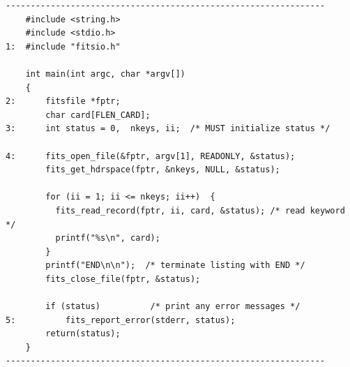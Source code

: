 \documentclass[11pt]{article}
\begin{document}
\begin{verbatim}
----------------------------------------------------------------
    #include <string.h>
    #include <stdio.h>
1:  #include "fitsio.h"

    int main(int argc, char *argv[])
    {
2:      fitsfile *fptr;
        char card[FLEN_CARD];
3:      int status = 0,  nkeys, ii;  /* MUST initialize status */

4:      fits_open_file(&fptr, argv[1], READONLY, &status);
        fits_get_hdrspace(fptr, &nkeys, NULL, &status);

        for (ii = 1; ii <= nkeys; ii++)  {
          fits_read_record(fptr, ii, card, &status); /* read keyword */
          printf("%s\n", card);
        }
        printf("END\n\n");  /* terminate listing with END */
        fits_close_file(fptr, &status);

        if (status)          /* print any error messages */
5:          fits_report_error(stderr, status);
        return(status);
    }
----------------------------------------------------------------
\end{verbatim}
\end{document}
